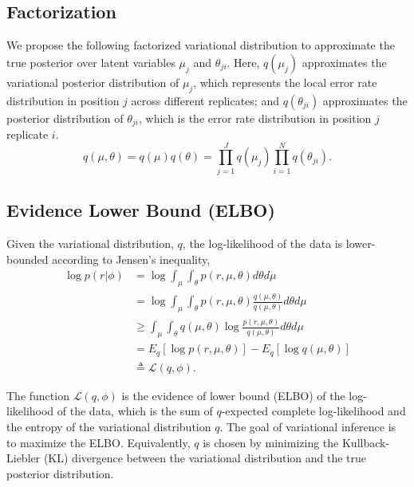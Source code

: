 \documentclass[11pt,reqno]{amsart}
\begin{document}
\subsection{Factorization}
We propose the following factorized variational distribution to approximate the true posterior over latent variables $\mu_j$ and $\theta_{ji}$.
Here, $q(\mu_j)$ approximates the variational posterior distribution of $\mu_j$, which represents the local error rate distribution in position $j$ across different replicates;
and $q(\theta_{ji})$ approximates the posterior distribution of $\theta_{ji}$, which is the error rate distribution in position $j$ replicate $i$.
\begin{equation}
  q(\mu, \theta) = q(\mu)q(\theta) = \prod_{j=1}^J q(\mu_{j}) \prod_{i=1}^N q(\theta_{ji}).
  \label{eq:vardist}
\end{equation}
\subsection{Evidence Lower Bound (ELBO)}
Given the variational distribution, $q$, the log-likelihood of the data is lower-bounded according to Jensen's inequality,
\begin{equation}
\begin{split}
\log p \left( r | \phi \right) &= \log \int_\mu \int_\theta p\left(r,\mu,\theta \right) d\theta d\mu \\
&= \log \int_\mu \int_\theta p\left(r,\mu,\theta \right)\frac{q\left(\mu,\theta \right) }{q\left(\mu,\theta \right) } d\theta d\mu \\
&\geq \int_\mu \int_\theta q\left(\mu,\theta \right) \log \frac{ p\left(r,\mu,\theta \right)}{q\left(\mu,\theta \right)} d\theta d\mu \\
&= E_q \left[ \log p\left(r,\mu,\theta \right)\right] - E_q \left[ \log q\left(\mu,\theta \right)\right] \\
&\triangleq \mathcal{L}(q, \phi).
\end{split}
\end{equation}

The function $\mathcal{L}(q, \phi)$ is the evidence of lower bound (ELBO) of the log-likelihood of the data, which is the sum of $q$-expected complete log-likelihood and the entropy of the variational distribution $q$.
The goal of variational inference is to maximize the ELBO.
Equivalently, $q$ is chosen by minimizing the Kullback-Liebler (KL) divergence between the variational distribution and the true posterior distribution.
\end{document}
